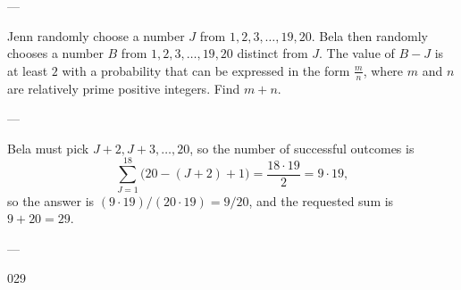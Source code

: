 
---

Jenn randomly choose a number $J$ from $1,2,3,\ldots,19,20$. Bela then randomly chooses a number $B$ from $1,2,3,\ldots,19,20$ distinct from $J$. The value of $B-J$ is at least $2$ with a probability that can be expressed in the form $\tfrac mn$, where $m$ and $n$ are relatively prime positive integers. Find $m+n$.

---

Bela must pick $J+2,J+3,\ldots,20$, so the number of successful outcomes is \[\sum_{J=1}^{18}\big(20-(J+2)+1\big)=\frac{18\cdot 19}2=9\cdot 19,\]
so the answer is $(9\cdot 19)/(20\cdot 19)=9/20$, and the requested sum is $9+20=29$.

---

029
